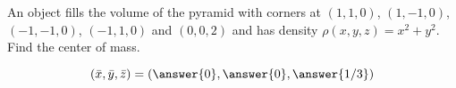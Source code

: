 \documentclass{ximera}
\author{David Guichard \and Neal Koblitz \and H. Jerome Keisler \and Albert Scheller \and Barry Balof \and Mike Wills \and Matthew Carr}
\begin{document}
\begin{exercise}




An object fills the volume of the pyramid with corners at $(1,1,0)$, $(1,-1,0)$, $(-1,-1,0)$, $(-1,1,0)$ and $(0,0,2)$ and has density $\rho(x,y,z)=x^2+y^2$. Find the center of mass.
\begin{prompt}
\[
\left(\bar{x},\bar{y},\bar{z}\right)=\left(\answer{0},\answer{0},\answer{1/3}\right)
\]
\end{prompt}



\end{exercise}
\end{document}

